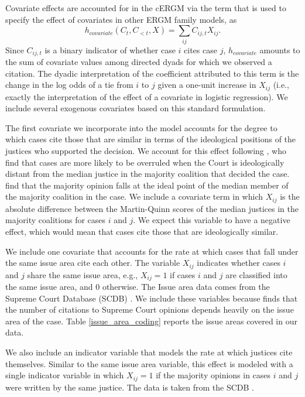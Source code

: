 \documentclass[headsepline=true, abstracton]{scrartcl}
\begin{document}
Covariate effects are accounted for in the cERGM via the term that is used to specify the effect of covariates in other ERGM family models, as
$$h_{covariate}(C_t,C_{<t},X) =  \sum_{ij} C_{ij,t}X_{ij}.$$ Since $C_{ij,t}$ is a binary indicator of whether case $i$ cites case $j$, $h_{covariate}$ amounts to the sum of covariate values among directed dyads for which we observed a citation. The dyadic interpretation of the coefficient attributed to this term is the change in the log odds of a tie from $i$ to $j$ given a one-unit increase in $X_{ij}$ (i.e., exactly the interpretation of the effect of a covariate in logistic regression). We include several exogenous covariates based on this standard formulation. 

The first covariate we incorporate into the model accounts for the degree to which cases cite those that are similar in terms of the ideological positions of the justices who supported the decision. We account for this effect following \citet{spriggs2001explaining}, who find that cases are more likely to be overruled when the Court is ideologically distant from the median justice in the majority coalition that decided the case. \citet{clark2010locating} find that the majority opinion falls at the ideal point of the median member of the majority coalition in the case. We include a covariate term in which $X_{ij}$ is the absolute difference between the Martin-Quinn scores \citep{martin2002dynamic} of the median justices in the majority coalitions for cases $i$ and $j$. We expect this variable to have a negative effect, which would mean that cases cite those that are ideologically similar.

We include one covariate that accounts for the rate at which cases that fall under the same issue area cite each other. The variable $X_{ij}$ indicates whether cases $i$ and $j$ share the same issue area, e.g., $X_{ij}=1$ if cases $i$ and $j$ are classified into the same issue area, and $0$ otherwise. The Issue area data comes from the Supreme Court Database (SCDB) \citep{spaeth2014supreme}. We include these variables because \citet{cross2010determinants} finds that the number of citations to Supreme Court opinions depends heavily on the issue area of the case. Table \ref{issue_area_coding} reports the issue areas covered in our data.

We also include an indicator variable that models the rate at which justices cite themselves. Similar to the same issue area variable, this effect is modeled with a single indicator variable in which $X_{ij} = 1$ if the majority opinions in cases $i$ and $j$ were written by the same justice. The data is taken from the SCDB \citep{spaeth2014supreme}. 
\end{document}
